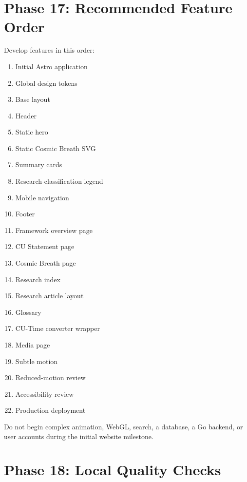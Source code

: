 \documentclass[11pt,letterpaper]{article}
\begin{document}
\section{Phase 17: Recommended Feature Order}

Develop features in this order:

\begin{enumerate}
    \item Initial Astro application
    \item Global design tokens
    \item Base layout
    \item Header
    \item Static hero
    \item Static Cosmic Breath SVG
    \item Summary cards
    \item Research-classification legend
    \item Mobile navigation
    \item Footer
    \item Framework overview page
    \item CU Statement page
    \item Cosmic Breath page
    \item Research index
    \item Research article layout
    \item Glossary
    \item CU-Time converter wrapper
    \item Media page
    \item Subtle motion
    \item Reduced-motion review
    \item Accessibility review
    \item Production deployment
\end{enumerate}

\begin{safetybox}
Do not begin complex animation, WebGL, search, a database, a Go
backend, or user accounts during the initial website milestone.
\end{safetybox}

\section{Phase 18: Local Quality Checks}
\end{document}
